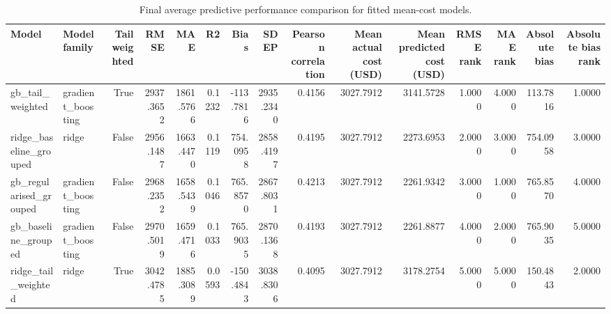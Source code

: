 \begin{table}
\caption{Final average predictive performance comparison for fitted mean-cost models.}
\label{tab:09-final-average-model-performance}
\begin{tabular}{llrrrrrrrrrrrrr}
\toprule
Model & Model family & Tail weighted & RMSE & MAE & R2 & Bias & SDEP & Pearson correlation & Mean actual cost (USD) & Mean predicted cost (USD) & RMSE rank & MAE rank & Absolute bias & Absolute bias rank \\
\midrule
gb_tail_weighted & gradient_boosting & True & 2937.3652 & 1861.5766 & 0.1232 & -113.7816 & 2935.2340 & 0.4156 & 3027.7912 & 3141.5728 & 1.0000 & 4.0000 & 113.7816 & 1.0000 \\
ridge_baseline_grouped & ridge & False & 2956.1487 & 1663.4470 & 0.1119 & 754.0958 & 2858.4197 & 0.4195 & 3027.7912 & 2273.6953 & 2.0000 & 3.0000 & 754.0958 & 3.0000 \\
gb_regularised_grouped & gradient_boosting & False & 2968.2352 & 1658.5439 & 0.1046 & 765.8570 & 2867.8031 & 0.4213 & 3027.7912 & 2261.9342 & 3.0000 & 1.0000 & 765.8570 & 4.0000 \\
gb_baseline_grouped & gradient_boosting & False & 2970.5019 & 1659.4716 & 0.1033 & 765.9035 & 2870.1368 & 0.4193 & 3027.7912 & 2261.8877 & 4.0000 & 2.0000 & 765.9035 & 5.0000 \\
ridge_tail_weighted & ridge & True & 3042.4785 & 1885.3089 & 0.0593 & -150.4843 & 3038.8306 & 0.4095 & 3027.7912 & 3178.2754 & 5.0000 & 5.0000 & 150.4843 & 2.0000 \\
\bottomrule
\end{tabular}
\end{table}
